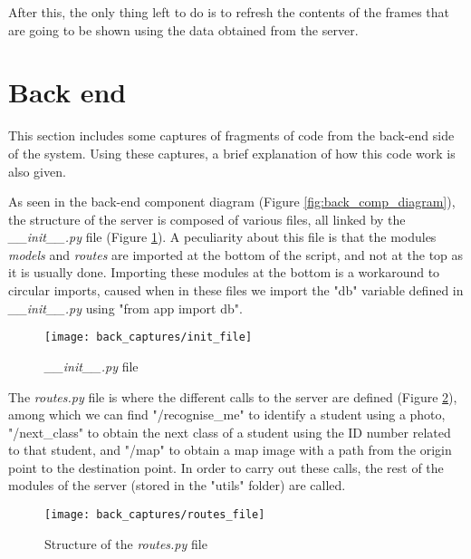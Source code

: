 After this, the only thing left to do is to refresh the contents of the frames that are going to be shown using the data obtained from the server.




\section{Back end}	
This section includes some captures of fragments of code from the back-end side of the system. Using these captures, a brief explanation of how this code work is also given. 

As seen in the back-end component diagram (Figure \ref{fig:back_comp_diagram}), the structure of the server is composed of various files, all linked by the \textit{{\_}{\_}init{\_}{\_}.py} file (Figure \ref{fig:init_file}). A peculiarity about this file is that the modules \textit{models} and \textit{routes} are imported at the bottom of the script, and not at the top as it is usually done. Importing these modules at the bottom is a workaround to circular imports, caused when in these files we import the "db" variable defined in \textit{{\_}{\_}init{\_}{\_}.py} using "from app import db".

\clearpage

\begin{figure}[!ht]
	\centering
	\texttt{[image: back\_captures/init\_file]}
	\caption{\textit{{\_}{\_}init{\_}{\_}.py} file}
	\label{fig:init_file}
\end{figure}

The \textit{routes.py} file is where the different calls to the server are defined (Figure \ref{fig:routes_file}), among which we can find "/recognise{\_}me" to identify a student using a photo, "/next{\_}class" to obtain the next class of a student using the ID number related to that student, and "/map" to obtain a map image with a path from the origin point to the destination point. In order to carry out these calls, the rest of the modules of the server (stored in the "utils" folder) are called. 

\begin{figure}[!ht]
	\centering
	\texttt{[image: back\_captures/routes\_file]}
	\caption{Structure of the \textit{routes.py} file}
	\label{fig:routes_file}
\end{figure}

